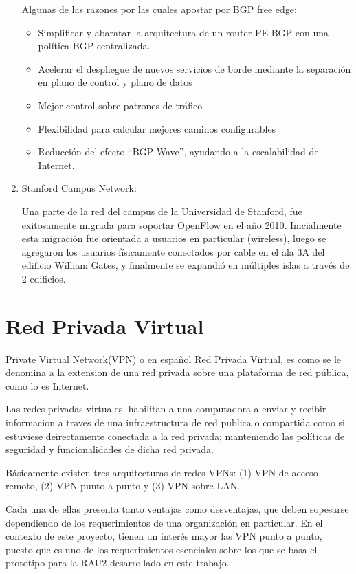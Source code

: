 \begin{enumerate}
Algunas de las razones por las cuales apostar por BGP free edge:
\begin{itemize}
\item Simplificar y abaratar la arquitectura de un router PE-BGP con una política BGP centralizada.
\item Acelerar el despliegue de nuevos servicios de borde mediante la separación en plano de control y plano de datos
\item Mejor control sobre patrones de tráfico
\item Flexibilidad para calcular mejores caminos configurables
\item Reducción del efecto ``BGP Wave'', ayudando a la escalabilidad de Internet.
\end{itemize}

\item Stanford Campus Network:

Una parte de la red del campus de la Universidad de Stanford, fue exitosamente migrada para soportar OpenFlow en el año 2010.
Inicialmente esta migración fue orientada a usuarios en particular (wireless), luego se agregaron los usuarios físicamente conectados por cable en el ala 3A del edificio William Gates, y finalmente se expandió en múltiples islas a través de 2 edificios.

\end{enumerate}

\section{Red Privada Virtual}

Private Virtual Network(VPN) o en español Red Privada Virtual, es como se le denomina a la extension de una red privada sobre una plataforma de red p\'ublica, como lo es Internet.

Las redes privadas virtuales, habilitan a una computadora a enviar y recibir informacion a traves de una infraestructura de red publica o compartida como si estuviese deirectamente conectada a la red privada; manteniendo las políticas de seguridad y funcionalidades de dicha red privada.

Básicamente existen tres arquitecturas de redes VPNs: (1) VPN de acceso remoto, (2) VPN punto a punto y (3) VPN sobre LAN.

Cada una de ellas presenta tanto ventajas como desventajas, que deben sopesarse dependiendo de los requerimientos de una organización en particular. En el contexto de este proyecto, tienen un interés mayor las VPN punto a punto, puesto que es uno de los requerimientos esenciales sobre los que se basa el prototipo para la RAU2 desarrollado en este trabajo.


